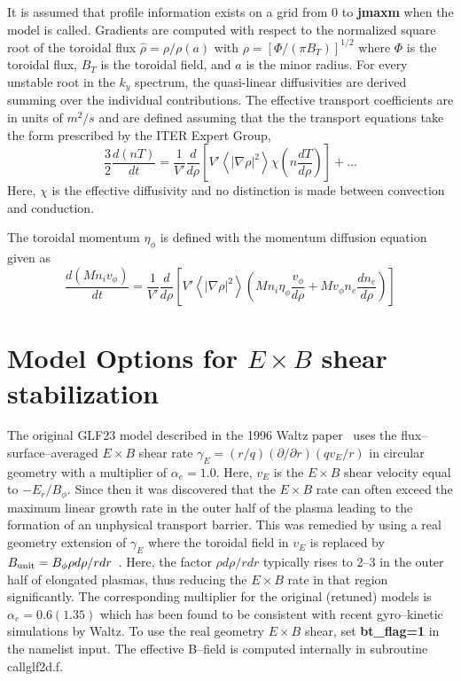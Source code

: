 It is assumed that profile information exists on a grid from
0 to {\bf jmaxm} when the model is called. Gradients are computed
with respect to the normalized square root of the toroidal flux $\hat{\rho}=\rho/\rho(a)$
with $\rho=\left[ \Phi/(\pi B_T) \right]^{1/2}$ where $\Phi$ is the toroidal flux, 
$B_T$ is the toroidal field, and $a$ is the minor radius.
For every unstable root in the $k_y$ spectrum, the quasi-linear
diffusivities are derived summing over the individual contributions. 
The effective transport coefficients are in units 
of $m^2/s$ and are defined assuming that the the transport equations 
take the form prescribed by the ITER Expert Group,
$$
\frac{3}{2}\frac{d(n T)}{dt} =
\frac{1}{V'} \frac{d}{d\rho} \left[ V'
\left<|\nabla \rho|^2\right> \chi \left( n \frac{dT}{d\rho} \right) \right]
     + \dots
\nonumber
$$
Here, $\chi$ is the effective diffusivity and no distinction is
made between convection and conduction.

\noindent
The toroidal momentum $\eta_{\phi}$ is defined with the
momentum diffusion equation given as
$$
 \frac{d (M n_i v_{\phi})}{dt} =
\frac{1}{V'} \frac{d}{d\rho} \left[ V'
\left<|\nabla \rho|^2\right> \left( M n_i \eta_{\phi} \frac{v_{\phi}}{d\rho}
+ M v_{\phi} n_e \frac{d n_e}{d\rho} \right) \right]
$$

\section{Model Options for $E\times B$ shear stabilization}
The original GLF23 model described in the 1996 Waltz 
paper~\cite{waltz97} uses the flux--surface--averaged 
$E\times B$ shear rate $\gamma_E=(r/q)(\partial / \partial r)(qv_E/r)$
in circular geometry with a multiplier of $\alpha_e=1.0$.
Here, $v_E$ is the $E\times B$ shear velocity equal to
$-E_r/B_{\phi}$.
Since then it was discovered that the $E\times B$ rate
can often exceed the maximum linear growth rate in the
outer half of the plasma leading to the formation of
an unphysical transport barrier. This was remedied
by using a real geometry extension of $\gamma_E$ 
where the toroidal field in $v_E$ is replaced by
$B_{\rm unit}=B_{\phi} \rho d\rho/rdr$~\cite{waltz99}. 
Here, the factor $\rho d\rho/rdr$ typically rises 
to 2--3 in the outer half of elongated plasmas, thus 
reducing the $E\times B$ rate in that region significantly. 
The corresponding multiplier for the original (retuned)
models is $\alpha_e=0.6(1.35)$ which has
been found to be consistent with recent gyro--kinetic
simulations by Waltz. To use the real geometry $E\times B$
shear, set {\bf bt\_flag=1} in the namelist input. 
The effective B--field is computed
internally in subroutine callglf2d.f.

